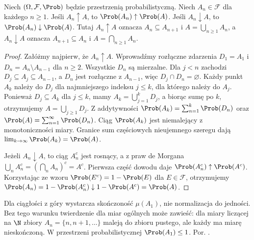 \begin{twierdzenie}
Niech $(\Omega,\mathcal F,\Prob)$ będzie przestrzenią probabilistyczną.
Niech $A_n\in\mathcal F$ dla każdego $n\geq1$.
Jeśli $A_n\uparrow A$, to $\Prob(A_n)\uparrow\Prob(A)$.
Jeśli $A_n\downarrow A$, to $\Prob(A_n)\downarrow\Prob(A)$.
Tutaj $A_n\uparrow A$ oznacza $A_n\subseteq A_{n+1}$ i
$A=\bigcup_{n\geq1}A_n$, a $A_n\downarrow A$ oznacza
$A_{n+1}\subseteq A_n$ i $A=\bigcap_{n\geq1}A_n$.
\end{twierdzenie}
\begin{proof}
Załóżmy najpierw, że $A_n\uparrow A$.
Wprowadźmy rozłączne zdarzenia
$D_1=A_1$ i $D_n=A_n\setminus A_{n-1}$ dla $n\geq2$.
Wszystkie $D_n$ są mierzalne. Dla $j<n$ zachodzi
$D_j\subseteq A_j\subseteq A_{n-1}$, a $D_n$ jest rozłączne
z $A_{n-1}$, więc $D_j\cap D_n=\varnothing$.
Każdy punkt $A_k$ należy do $D_j$ dla najmniejszego indeksu
$j\leq k$, dla którego należy do $A_j$. Ponieważ $D_j\subseteq A_k$
dla $j\leq k$, mamy $A_k=\bigcup_{j=1}^k D_j$,
a biorąc sumę po $k$, otrzymujemy $A=\bigcup_{j\geq1}D_j$.
Z addytywności
$\Prob(A_k)=\sum_{n=1}^k\Prob(D_n)$ oraz
$\Prob(A)=\sum_{n=1}^\infty\Prob(D_n)$.
Ciąg $\Prob(A_k)$ jest niemalejący z monotoniczności miary.
Granice sum częściowych nieujemnego szeregu dają
$\lim_{k\to\infty}\Prob(A_k)=\Prob(A)$.

Jeżeli $A_n\downarrow A$, to ciąg $A_n^c$ jest rosnący,
a z praw de Morgana
$\bigcup_n A_n^c=(\bigcap_n A_n)^c=A^c$.
Pierwsza część dowodu daje
$\Prob(A_n^c)\uparrow\Prob(A^c)$. Korzystając ze wzoru
$\Prob(E^c)=1-\Prob(E)$ dla $E\in\mathcal F$,
otrzymujemy
$\Prob(A_n)=1-\Prob(A_n^c)\downarrow1-\Prob(A^c)
=\Prob(A)$.
\end{proof}

\begin{uwaga}
Dla ciągłości z góry wystarcza skończoność $\mu(A_1)$,
nie normalizacja do jedności. Bez tego warunku twierdzenie
dla miar ogólnych może zawieść: dla miary liczącej na $\N$
zbiory $A_n=\{n,n+1,\ldots\}$ maleją do zbioru pustego,
ale każdy ma miarę nieskończoną. W przestrzeni probabilistycznej
$\Prob(A_1)\leq1$. Por.
.
\end{uwaga}

